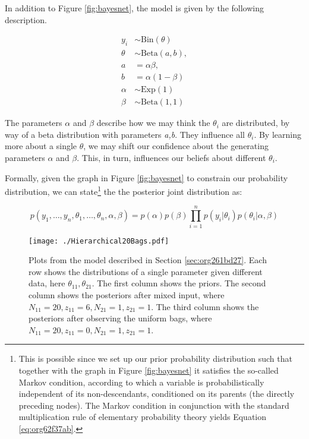 \documentclass[11pt, a4paper]{article}
\begin{document}
In addition to Figure \ref{fig:bayesnet}, the model is given by the following
description.

\begin{align*}
  y_i &\sim \text{Bin}(\theta) \\
  \theta &\sim \text{Beta}(a,b),  \\
  a &= \alpha\beta, \\ 
  b &= \alpha(1-\beta) \\ 
  \alpha &\sim \text{Exp}(1) \\
  \beta &\sim \text{Beta}(1,1) 
\end{align*}

The parameters \(\alpha\) and \(\beta\) describe how we may think the
\(\theta_i\) are distributed, by way of a beta distribution with parameters
\emph{a,b}. They influence all \(\theta_i\). By learning more about a single
\(\theta\), we may shift our confidence about the generating parameters
\(\alpha\) and \(\beta\). This, in turn, influences our beliefs about different
\(\theta_i\).

Formally, given the graph in Figure \ref{fig:bayesnet} to constrain our
probability distribution, we can state\footnote{This is possible since we set up our
  prior probability distribution such that together with the graph in Figure
  \ref{fig:bayesnet} it satisfies the so-called Markov condition, according to
  which a variable is probabilistically independent of its non-descendants,
  conditioned on its parents (the directly preceding nodes). The Markov
  condition in conjunction with the standard multiplication rule of elementary
  probability theory yields Equation \ref{eq:org62f37ab}.} the the posterior joint
distribution as:

\begin{equation}
  \label{eq:org62f37ab}
  p(y_1,\dots,y_n,\theta_1,\dots,\theta_n,\alpha,\beta) = p(\alpha)p(\beta)\prod_{i=1}^n p(y_i|\theta_i)p(\theta_i|\alpha,\beta)
\end{equation}

\begin{figure}[htbp]
  \centering \texttt{[image: ./Hierarchical20Bags.pdf]}
  \caption{\label{fig:org7eac43f} Plots from the model described in Section
    \ref{sec:org261bd27}. Each row shows the distributions of a single parameter
    given different data, here \(\theta_{11}, \theta_{21}\). The first column
    shows the priors. The second column shows the posteriors after mixed input,
    where \(N_{11} = 20, z_{11} = 6, N_{21} = 1, z_{21} = 1\). The third column
    shows the posteriors after observing the uniform bags, where \(N_{11} = 20,
    z_{11} = 0, N_{21} = 1, z_{21} = 1\).}
\end{figure}
\end{document}
